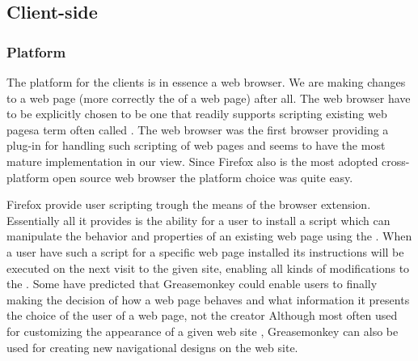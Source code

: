 \subsection{Client-side}

\subsubsection{Platform}
\label{section:selection.stack.client.platform}

The platform for the clients is in essence a web browser. We are making
changes to a web page (more correctly the  of a web page)
after all. The web browser have to be explicitly chosen
to be one that readily supports scripting existing
web pages\dash{}a term often called .
The %
web browser was the first browser providing a
plug-in for handling such scripting of web pages and seems to have the most
mature implementation in our view. Since Firefox also is the
most adopted%
cross-platform open source web browser the platform choice was quite easy.

Firefox provide user scripting trough the means of the
%
browser extension. Essentially all it provides is the ability for a user to
install a script which can manipulate the behavior and properties of an
existing web page using the .%
When a user have such a script for a specific web page installed its
instructions will be executed on the next visit to the given site, enabling
all kinds of modifications to the .
Some have predicted that Greasemonkey could enable users to
finally \dash{}making the decision of how a web page
behaves and what information it presents the choice of the user of a web page,
not the creator \citep[pp.~3--4.]{filman06}
Although most often used
for customizing the appearance of a given web site \citep[p.~39]{vitali06},
Greasemonkey can also be used for creating new navigational designs on the
\urort{} web site.

